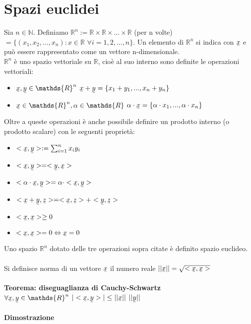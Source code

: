 \documentclass{article}
\newcommand\ubar[1]{\stackunder[1.2pt]{$#1$}{\rule{.8ex}{.075ex}}}
\begin{document}
\section{Spazi euclidei}
Sia $n \in \mathds{N}$. Definiamo $\mathds{R}^n:= \mathds{R} \times \mathds{R} \times ... \times \mathds{R}$ (per n volte) $= \{(x_1,x_2,...,x_n): x \in \mathds{R}$ $\forall i=1,2,...,n\}$. Un elemento di $\mathds{R}^n$ si indica con $\ubar{x}$ e può essere rappresentato come un vettore n-dimensionale.\\
$\mathds{R}^n$ è uno spazio vettoriale su $\mathds{R}$, cioè al suo interno sono definite le operazioni vettoriali: \begin{itemize}
    \item $\ubar{x},\ubar{y} \in \mathds{R}^n$ \quad $\ubar{x} + \ubar{y}=\{x_1+y_1,...,x_n+y_n\}$
    \item $\ubar{x} \in \mathds{R}^n, \alpha \in \mathds{R}$ \quad $\alpha \cdot \ubar{x}=\{\alpha \cdot x_1,...,\alpha \cdot x_n\}$
\end{itemize}
Oltre a queste operazioni è anche possibile definire un prodotto interno (o prodotto scalare) con le seguenti proprietà: \begin{itemize}
    \item $<\ubar{x}, \ubar{y}>:=\sum_{i=1}^n x_iy_i$
    \item $<\ubar{x}, \ubar{y}> = <\ubar{y}, \ubar{x}>$
    \item $<\alpha \cdot \ubar{x}, \ubar{y}> = \alpha \cdot <\ubar{x}, \ubar{y}>$
    \item $<\ubar{x} + \ubar{y}, \ubar{z}> = <\ubar{x}, \ubar{z}> + <\ubar{y}, \ubar{z}>$
    \item $<\ubar{x}, \ubar{x}> \geq 0$
    \item $<\ubar{x}, \ubar{x}> = 0 \Leftrightarrow \ubar{x}=0$
\end{itemize}
Uno spazio $\mathds{R}^n$ dotato delle tre operazioni sopra citate è definito spazio euclideo.\\\\
Si definisce norma di un vettore $\ubar{x}$ il numero reale $||\ubar{x}|| = \sqrt{<\ubar{x}, \ubar{x}>}$\\\\
\textbf{Teorema: diseguaglianza di Cauchy-Schwartz}\\
$\forall \ubar{x},\ubar{y}\in\mathds{R}^n$ \quad $|<\ubar{x}, \ubar{y}>| \leq ||\ubar{x}||$ $||\ubar{y}||$\\\\
\textbf{Dimostrazione}\\
\end{document}
